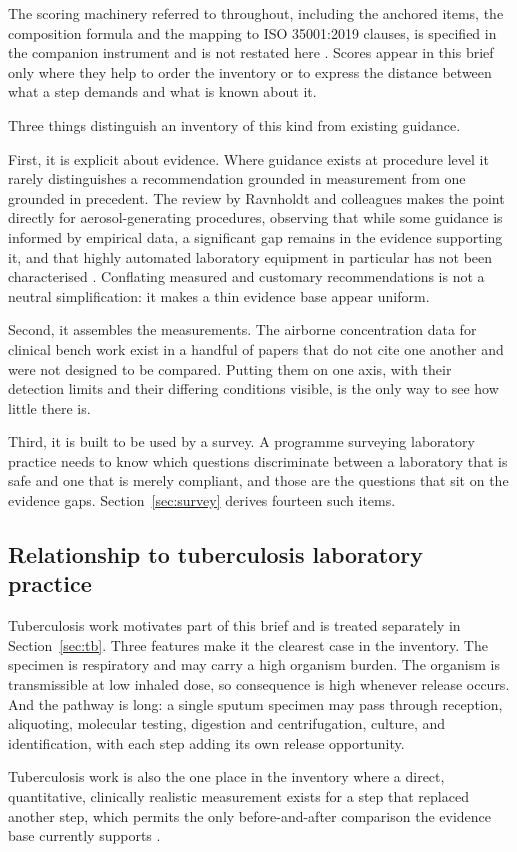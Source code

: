 The scoring machinery referred to throughout, including the anchored items, the
composition formula and the mapping to ISO 35001:2019 clauses, is specified in
the companion instrument and is not restated here \cite{oyeniyi2026}. Scores
appear in this brief only where they help to order the inventory or to express
the distance between what a step demands and what is known about it.

Three things distinguish an inventory of this kind from existing guidance.

First, it is explicit about evidence. Where guidance exists at procedure level
it rarely distinguishes a recommendation grounded in measurement from one
grounded in precedent. The review by Ravnholdt and colleagues makes the point
directly for aerosol-generating procedures, observing that while some guidance
is informed by empirical data, a significant gap remains in the evidence
supporting it, and that highly automated laboratory equipment in particular has
not been characterised \cite{ravnholdt2025}. Conflating measured and customary
recommendations is not a neutral simplification: it makes a thin evidence base
appear uniform.

Second, it assembles the measurements. The airborne concentration data for
clinical bench work exist in a handful of papers that do not cite one another
and were not designed to be compared. Putting them on one axis, with their
detection limits and their differing conditions visible, is the only way to see
how little there is.

Third, it is built to be used by a survey. A programme surveying laboratory
practice needs to know which questions discriminate between a laboratory that is
safe and one that is merely compliant, and those are the questions that sit on
the evidence gaps. Section~\ref{sec:survey} derives fourteen such items.

\subsection{Relationship to tuberculosis laboratory practice}

Tuberculosis work motivates part of this brief and is treated separately in
Section~\ref{sec:tb}. Three features make it the clearest case in the
inventory. The specimen is respiratory and may carry a high organism burden.
The organism is transmissible at low inhaled dose, so consequence is high
whenever release occurs. And the pathway is long: a single sputum specimen may
pass through reception, aliquoting, molecular testing, digestion and
centrifugation, culture, and identification, with each step adding its own
release opportunity.

Tuberculosis work is also the one place in the inventory where a direct,
quantitative, clinically realistic measurement exists for a step that replaced
another step, which permits the only before-and-after comparison the evidence
base currently supports \cite{banada2010}.
